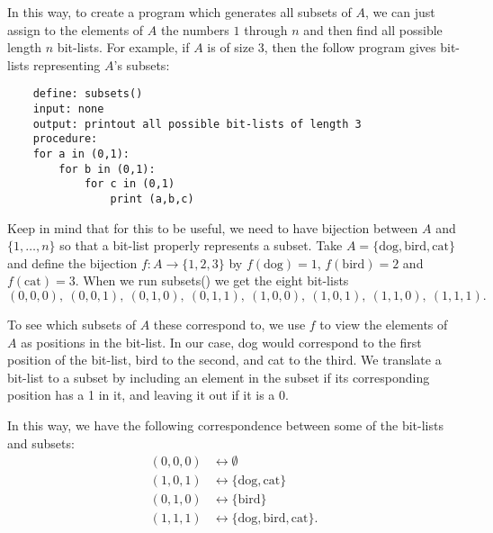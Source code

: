 In this way, to create a program which generates all subsets of
$A$, we can just assign to the elements of $A$ the numbers $1$ through $n$ and
then find all possible length $n$ bit-lists. For example, if $A$ is of size 3, then
the follow program gives bit-lists representing $A$'s subsets:
	\begin{verbatim}
	define: subsets()
	input: none
	output: printout all possible bit-lists of length 3
	procedure:
	for a in (0,1):
	    for b in (0,1):
	        for c in (0,1)
	            print (a,b,c)
	\end{verbatim}
Keep in mind that for this to be useful, we need to have bijection between
$A$ and $\{1,\ldots,n\}$ so that a bit-list properly represents a subset. Take
$A=\{\text{dog},\text{bird},\text{cat}\}$ and define the bijection $f:A\rightarrow 
\{1,2,3\}$ by
$f(\text{dog})=1$, $f(\text{bird})=2$ and $f(\text{cat})=3$. When we run subsets() we 
get the eight bit-lists 
	\[
	(0,0,0),\ (0,0,1),\ (0,1,0),\ (0,1,1),\ (1,0,0),\ (1,0,1),\ (1,1,0),\ (1,1,1).
	\]
	
To see which subsets of $A$ these
correspond to, we use $f$ to view the elements of $A$ as positions in the bit-list.
In our case, dog would correspond to the first position of the bit-list,
bird to the second, and
cat to the third. We translate a bit-list to a subset by including an element in the
subset if its corresponding position has a 1 in it, and leaving it out if it is a 0. 
\smallskip

In this way, we have the following correspondence between some
of the bit-lists and subsets:
\begin{align*}
(0,0,0) &\longleftrightarrow \emptyset\\
(1,0,1) &\longleftrightarrow \{\text{dog},\text{cat}\}\\
(0,1,0) &\longleftrightarrow \{\text{bird}\}\\
(1,1,1) &\longleftrightarrow \{\text{dog},\text{bird},\text{cat}\}.
\end{align*}
